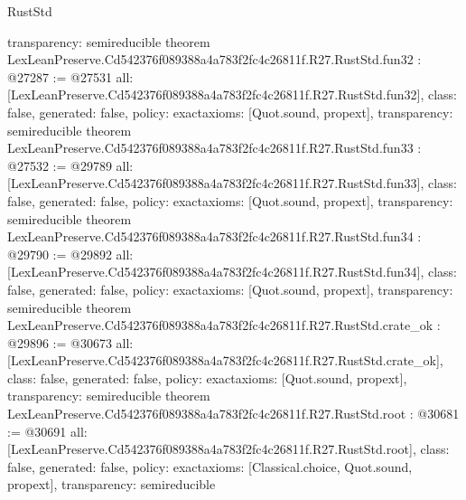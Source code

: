 \begin{lexlean}{RustStd}
\begin{coremodule}
{  transparency: semireducible
}
theorem LexLeanPreserve.Cd542376f089388a4a783f2fc4c26811f.R27.RustStd.fun32 : @27287 := @27531 {
  all: [LexLeanPreserve.Cd542376f089388a4a783f2fc4c26811f.R27.RustStd.fun32],
  class: false,
  generated: false,
  policy: exact{axioms: [Quot.sound, propext]},
  transparency: semireducible
}
theorem LexLeanPreserve.Cd542376f089388a4a783f2fc4c26811f.R27.RustStd.fun33 : @27532 := @29789 {
  all: [LexLeanPreserve.Cd542376f089388a4a783f2fc4c26811f.R27.RustStd.fun33],
  class: false,
  generated: false,
  policy: exact{axioms: [Quot.sound, propext]},
  transparency: semireducible
}
theorem LexLeanPreserve.Cd542376f089388a4a783f2fc4c26811f.R27.RustStd.fun34 : @29790 := @29892 {
  all: [LexLeanPreserve.Cd542376f089388a4a783f2fc4c26811f.R27.RustStd.fun34],
  class: false,
  generated: false,
  policy: exact{axioms: [Quot.sound, propext]},
  transparency: semireducible
}
theorem LexLeanPreserve.Cd542376f089388a4a783f2fc4c26811f.R27.RustStd.crate_ok : @29896 := @30673 {
  all: [LexLeanPreserve.Cd542376f089388a4a783f2fc4c26811f.R27.RustStd.crate_ok],
  class: false,
  generated: false,
  policy: exact{axioms: [Quot.sound, propext]},
  transparency: semireducible
}
theorem LexLeanPreserve.Cd542376f089388a4a783f2fc4c26811f.R27.RustStd.root : @30681 := @30691 {
  all: [LexLeanPreserve.Cd542376f089388a4a783f2fc4c26811f.R27.RustStd.root],
  class: false,
  generated: false,
  policy: exact{axioms: [Classical.choice, Quot.sound, propext]},
  transparency: semireducible
}


\end{coremodule}
\end{lexlean}

